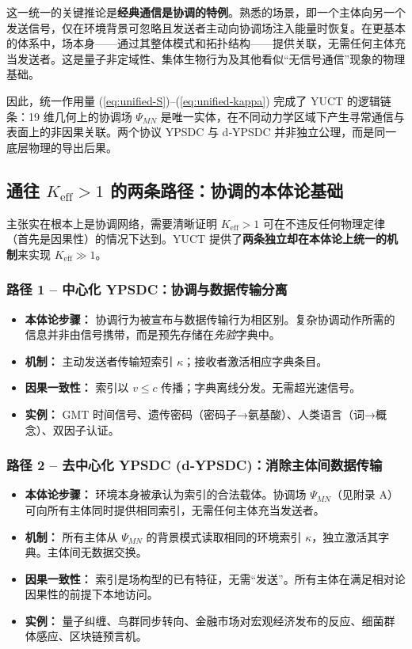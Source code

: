 \documentclass[12pt,a4paper]{article}
\begin{document}
	这一统一的关键推论是\textbf{经典通信是协调的特例}。熟悉的场景，即一个主体向另一个发送信号，仅在环境背景可忽略且发送者主动向协调场注入能量时恢复。在更基本的体系中，场本身——通过其整体模式和拓扑结构——提供关联，无需任何主体充当发送者。这是量子非定域性、集体生物行为及其他看似“无信号通信”现象的物理基础。
	
	因此，统一作用量 (\ref{eq:unified-S})–(\ref{eq:unified-kappa}) 完成了 YUCT 的逻辑链条：19 维几何上的协调场 \(\Psi_{MN}\) 是唯一实体，在不同动力学区域下产生寻常通信与表面上的非因果关联。两个协议 YPSDC 与 d‑YPSDC 并非独立公理，而是同一底层物理的导出后果。
	
	\subsection{通往 \(K_{\mathrm{eff}} > 1\) 的两条路径：协调的本体论基础}
	\label{subsec:two-paths-ontology}
	
	主张实在根本上是协调网络，需要清晰证明 \(K_{\mathrm{eff}} > 1\) 可在不违反任何物理定律（首先是因果性）的情况下达到。YUCT 提供了\textbf{两条独立却在本体论上统一的机制}来实现 \(K_{\mathrm{eff}} \gg 1\)。
	
	\subsubsection*{路径 1 – 中心化 YPSDC：协调与数据传输分离}
	\begin{itemize}[leftmargin=*]
		\item \textbf{本体论步骤：} 协调行为被宣布与数据传输行为相区别。复杂协调动作所需的信息并非由信号携带，而是预先存储在\textit{先验}字典中。
		\item \textbf{机制：} 主动发送者传输短索引 \(\kappa\)；接收者激活相应字典条目。
		\item \textbf{因果一致性：} 索引以 \(v \le c\) 传播；字典离线分发。无需超光速信号。
		\item \textbf{实例：} GMT 时间信号、遗传密码（密码子→氨基酸）、人类语言（词→概念）、双因子认证。
	\end{itemize}
	
	\subsubsection*{路径 2 – 去中心化 YPSDC (d‑YPSDC)：消除主体间数据传输}
	\begin{itemize}[leftmargin=*]
		\item \textbf{本体论步骤：} 环境本身被承认为索引的合法载体。协调场 \(\Psi_{MN}\)（见附录 A）可向所有主体同时提供相同索引，无需任何主体充当发送者。
		\item \textbf{机制：} 所有主体从 \(\Psi_{MN}\) 的背景模式读取相同的环境索引 \(\kappa\)，独立激活其字典。主体间无数据交换。
		\item \textbf{因果一致性：} 索引是场构型的已有特征，无需“发送”。所有主体在满足相对论因果性的前提下本地访问。
		\item \textbf{实例：} 量子纠缠、鸟群同步转向、金融市场对宏观经济发布的反应、细菌群体感应、区块链预言机。
	\end{itemize}
	
\end{document}
